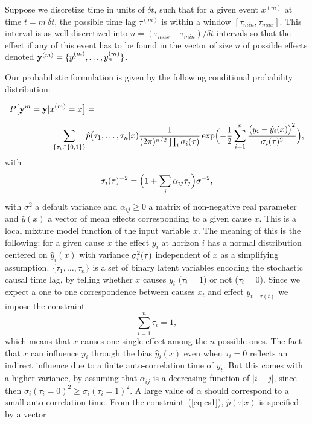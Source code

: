 \documentclass[envcountsect,runningheads]{llncs}
\theoremstyle{etoile}
\begin{document}
Suppose we discretize time in units of $\delta t$, such that for a given event $x^{(m)}$ at time  
$t = m\ \delta t$, the possible time lag $\tau^{(m)}$ is within a window $[\tau_{min},\tau_{max}]$. 
This interval is as well discretized into $n = (\tau_{max}-\tau_{min})/\delta t $ intervals so that 
the effect if any of this event has to be found in the vector of size $n$ of possible effects denoted 
${\bf y}^{(m)} = \{y_1^{(m)},\ldots,y_n^{(m)}\}$.

Our probabilistic formulation is given by the following conditional probability distribution:

\begin{align}
  P\bigl[{\bf y}^{m} = {\bf y}\vert x^{(m)}=x\bigr] &= \nonumber\\[0.2cm]
  \sum_{\{\tau_i\in\{0,1\}\}} & \hat p\bigl(\tau_1,\ldots,\tau_n\vert x)
\frac{1}{(2\pi)^{n/2}\prod_i\sigma_i({\bf \tau})}
\exp\Bigl(-\frac{1}{2}\sum_{i=1}^n\frac{\bigl(y_i-\hat y_i(x)\bigr)^2}{\sigma_i({\bf \tau})^2}\Bigr),\label{eq:py}
\end{align}
with 
\[
\sigma_i({\bf \tau})^{-2} = \Bigl(1+\sum_j\alpha_{ij} \tau_j\Bigr)\sigma^{-2},
\]
with $\sigma^2$ a default variance and $\alpha_{ij}\ge 0$ a matrix of non-negative real parameter and $\hat y(x)$ a vector of mean effects corresponding to a given cause $x$. 
This is a local mixture model function of the input variable $x$.
The meaning of this is the following: for a given cause $x$ the effect
$y_i$ at horizon $i$ has a normal distribution centered on $\hat y_i(x)$ with  variance $\sigma_i^2({\bf \tau})$ independent of $x$ as a simplifying assumption. $\{\tau_1,\ldots,\tau_n\}$ is a set of binary
latent variables encoding the stochastic causal time lag, by telling whether $x$ causes $y_i$ ($\tau_i=1$) or not ($\tau_i=0$). Since we expect a one to one correspondence between causes
$x_t$ and effect $y_{t+\tau(t)}$ we impose the constraint
\begin{equation}\label{eq:cs1}
\sum_{i=1}^n \tau_i = 1,
\end{equation}
which means that $x$ causes one single effect among the $n$ possible ones. The fact that $x$ can influence $y_i$ through the bias $\hat y_i(x)$ even when $\tau_i=0$ reflects an indirect
influence due to a finite auto-correlation time of $y_t$. But this comes with a higher variance, by assuming that $\alpha_{ij}$ is a decreasing function of $\vert i-j\vert$, 
since then $\sigma_i(\tau_i=0)^2\ge \sigma_i(\tau_i=1)^2$.
A large value of $\alpha$ should correspond to a small auto-correlation time. From the constraint~(\ref{eq:cs1}), $\hat p(\tau\vert x)$ is specified by  a vector
\end{document}
